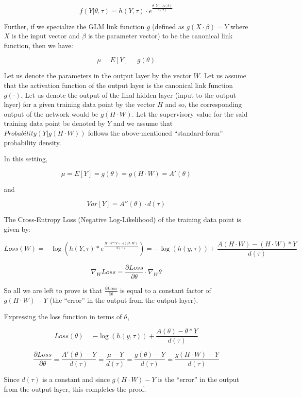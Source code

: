 \documentclass[10pt]{amsart}
\begin{document}
\begin{appendices}
$$f(Y | \theta, \tau) = h(Y, \tau) \cdot e^{\frac {\theta \cdot Y - A(\theta)} {d(\tau)}}$$

Further, if we specialize the GLM link function $g$ (defined as $g(X \cdot \beta) = Y$ where $X$ is the input vector and $\beta$ is the parameter vector) to be the canonical link function, then we have:

$$\mu = E[Y] = g(\theta)$$

Let us denote the parameters in the output layer by the vector $W$. Let us assume that the activation function of the output layer is the canonical link function $g(\cdot)$. Let us denote the output of the final hidden layer (input to the output layer) for a given training data point by the vector $H$ and so, the corresponding output of the network would be $g(H \cdot W)$. Let the supervisory value for the said training data point be denoted by $Y$ and we assume that $Probability(Y|g(H \cdot W))$ follows the above-mentioned ``standard-form'' probability density.

In this setting,

$$\mu = E[Y] = g(\theta) = g(H \cdot W) = A'(\theta)$$

and

$$Var[Y] = A''(\theta) \cdot d(\tau)$$

The Cross-Entropy Loss (Negative Log-Likelihood) of the training data point is given by:

$$Loss(W) = - \log (h(Y, \tau) * e^{\frac {H \cdot W * Y - A(H \cdot W)} {d(\tau)}}) = - \log (h(y, \tau)) + \frac {A(H \cdot W) - (H \cdot W) * Y} {d(\tau)}$$

$$\nabla_W Loss = \frac {\partial Loss}{\partial \theta} \cdot \nabla_W \theta$$

So all we are left to prove is that $\frac {\partial Loss}{\partial \theta}$ is equal to a constant factor of $g(H \cdot W) - Y$ (the ``error'' in the output from the output layer).

Expressing the loss function in terms of $\theta$,

$$Loss(\theta) = - \log (h(y, \tau)) + \frac {A(\theta) - \theta * Y} {d(\tau)}$$

$$\frac {\partial Loss}{\partial \theta} = \frac {A'(\theta) - Y} {d(\tau)} = \frac {\mu - Y} {d(\tau)} = \frac {g(\theta) - Y} {d(\tau)} = \frac {g(H \cdot W) - Y} {d(\tau)}$$

Since $d(\tau)$ is a constant and since $g(H \cdot W) - Y$ is the ``error'' in the output from the output layer, this completes the proof.


\end{appendices}
\end{document}
